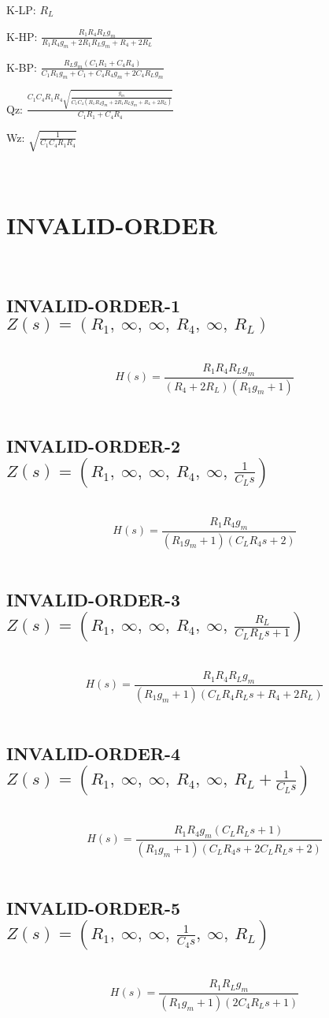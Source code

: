 \documentclass{article}
\begin{document}
K-LP: $R_{L}$\ 

K-HP: $\frac{R_{1} R_{4} R_{L} g_{m}}{R_{1} R_{4} g_{m} + 2 R_{1} R_{L} g_{m} + R_{4} + 2 R_{L}}$\ 

K-BP: $\frac{R_{L} g_{m} \left(C_{1} R_{1} + C_{4} R_{4}\right)}{C_{1} R_{1} g_{m} + C_{1} + C_{4} R_{4} g_{m} + 2 C_{4} R_{L} g_{m}}$\ 

Qz: $\frac{C_{1} C_{4} R_{1} R_{4} \sqrt{\frac{g_{m}}{C_{1} C_{4} \left(R_{1} R_{4} g_{m} + 2 R_{1} R_{L} g_{m} + R_{4} + 2 R_{L}\right)}}}{C_{1} R_{1} + C_{4} R_{4}}$\ 

Wz: $\sqrt{\frac{1}{C_{1} C_{4} R_{1} R_{4}}}$\ 

\ 

\section{INVALID-ORDER}\ 
\subsection{INVALID-ORDER-1 $Z(s) = \left( R_{1}, \  \infty, \  \infty, \  R_{4}, \  \infty, \  R_{L}\right)$ } \ 
\textbf{\[H(s) = \frac{R_{1} R_{4} R_{L} g_{m}}{\left(R_{4} + 2 R_{L}\right) \left(R_{1} g_{m} + 1\right)}\] } \ 
\subsection{INVALID-ORDER-2 $Z(s) = \left( R_{1}, \  \infty, \  \infty, \  R_{4}, \  \infty, \  \frac{1}{C_{L} s}\right)$ } \ 
\textbf{\[H(s) = \frac{R_{1} R_{4} g_{m}}{\left(R_{1} g_{m} + 1\right) \left(C_{L} R_{4} s + 2\right)}\] } \ 
\subsection{INVALID-ORDER-3 $Z(s) = \left( R_{1}, \  \infty, \  \infty, \  R_{4}, \  \infty, \  \frac{R_{L}}{C_{L} R_{L} s + 1}\right)$ } \ 
\textbf{\[H(s) = \frac{R_{1} R_{4} R_{L} g_{m}}{\left(R_{1} g_{m} + 1\right) \left(C_{L} R_{4} R_{L} s + R_{4} + 2 R_{L}\right)}\] } \ 
\subsection{INVALID-ORDER-4 $Z(s) = \left( R_{1}, \  \infty, \  \infty, \  R_{4}, \  \infty, \  R_{L} + \frac{1}{C_{L} s}\right)$ } \ 
\textbf{\[H(s) = \frac{R_{1} R_{4} g_{m} \left(C_{L} R_{L} s + 1\right)}{\left(R_{1} g_{m} + 1\right) \left(C_{L} R_{4} s + 2 C_{L} R_{L} s + 2\right)}\] } \ 
\subsection{INVALID-ORDER-5 $Z(s) = \left( R_{1}, \  \infty, \  \infty, \  \frac{1}{C_{4} s}, \  \infty, \  R_{L}\right)$ } \ 
\textbf{\[H(s) = \frac{R_{1} R_{L} g_{m}}{\left(R_{1} g_{m} + 1\right) \left(2 C_{4} R_{L} s + 1\right)}\] } \ 
\end{document}
